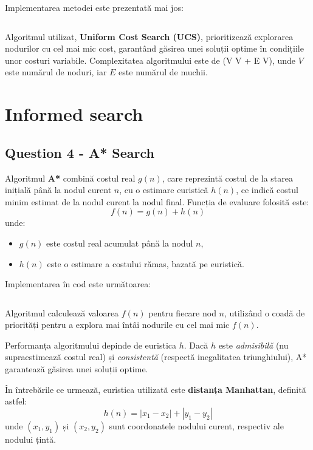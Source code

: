 \par Implementarea metodei este prezentată mai jos:
\inputminted[linenos]{python}{code/uniform_cost_search.py}
\par Algoritmul utilizat, \textbf{Uniform Cost Search (UCS)}, prioritizează explorarea nodurilor cu cel mai mic cost, garantând găsirea unei soluții optime în condițiile unor costuri variabile. Complexitatea algoritmului este de  (V \log V + E \log V), unde \( V \) este numărul de noduri, iar \( E \) este numărul de muchii.



\section{Informed search}
\subsection{Question 4 - A* Search}
\par Algoritmul \textbf{A*} combină costul real \( g(n) \), care reprezintă costul de la starea inițială până la nodul curent \( n \), cu o estimare euristică \( h(n) \), ce indică costul minim estimat de la nodul curent la nodul final. Funcția de evaluare folosită este:
\[
f(n) = g(n) + h(n)
\]
unde:
\begin{itemize}
	\item \( g(n) \) este costul real acumulat până la nodul \( n \),
	\item \( h(n) \) este o estimare a costului rămas, bazată pe euristică.
\end{itemize}

\par Implementarea în cod este următoarea:
\inputminted[linenos]{python}{code/a_star_search.py}

\par Algoritmul calculează valoarea \( f(n) \) pentru fiecare nod \( n \), utilizând o coadă de priorități pentru a explora mai întâi nodurile cu cel mai mic \( f(n) \). 

\par Performanța algoritmului depinde de euristica \( h \). Dacă \( h \) este \textit{admisibilă} (nu supraestimează costul real) și \textit{consistentă} (respectă inegalitatea triunghiului), A* garantează găsirea unei soluții optime. 

\par În întrebările ce urmează, euristica utilizată este \textbf{distanța Manhattan}, definită astfel:
\[
h(n) = |x_1 - x_2| + |y_1 - y_2|
\]
unde \((x_1, y_1)\) și \((x_2, y_2)\) sunt coordonatele nodului curent, respectiv ale nodului țintă.

